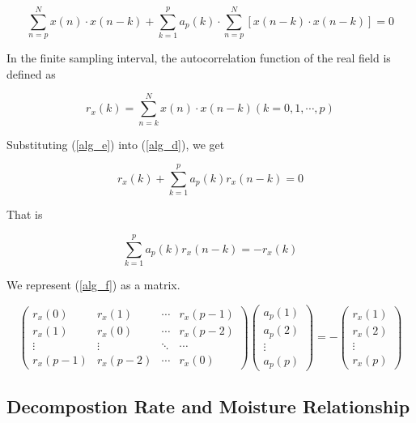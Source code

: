 \documentclass{mcmthesis}
\begin{document}
\begin{equation}
  \sum_{n=p}^{N} x(n) \cdot x(n-k)+\sum_{k=1}^{p} a_{p}(k) \cdot \sum_{n=p}^{N}[x(n-k) \cdot x(n-k)]=0
\end{equation}

In the finite sampling interval, the autocorrelation function of the real field is defined as

\begin{equation}
  r_{x}(k)=\sum_{n=k}^{N} x(n) \cdot x(n-k)(k=0,1, \cdots, p)
  \label{alg_e}
\end{equation}

Substituting (\ref{alg_e}) into (\ref{alg_d}), we get

\begin{equation}
  r_{x}(k)+\sum_{k=1}^{p} a_{p}(k) r_{x}(n-k)=0
\end{equation}

That is

\begin{equation}
  \sum_{k=1}^{p} a_{p}(k) r_{x}(n-k)=-r_{x}(k)
  \label{alg_f}
\end{equation}

We represent (\ref{alg_f}) as a matrix.

\begin{equation}
  \left(\begin{array}{cccc}
  r_{x}(0) & r_{x}(1) & \cdots & r_{x}(p-1) \\
  r_{x}(1) & r_{x}(0) & \cdots & r_{x}(p-2) \\
  \vdots & \vdots & \ddots & \cdots \\
  r_{x}(p-1) & r_{x}(p-2) & \cdots & r_{x}(0)
  \end{array}\right)\left(\begin{array}{c}
  a_{p}(1) \\
  a_{p}(2) \\
  \vdots \\
  a_{p}(p)
  \end{array}\right)=-\left(\begin{array}{c}
  r_{x}(1) \\
  r_{x}(2) \\
  \vdots \\
  r_{x}(p)
  \end{array}\right)
\end{equation}

\subsection{Decompostion Rate and Moisture Relationship}
\end{document}
